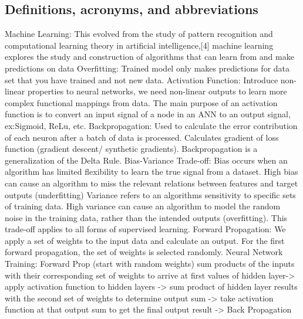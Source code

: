 \documentclass[draftclsnofoot, onecolumn, 10pt, compsoc]{IEEEtran}
\begin{document}
\subsection{Definitions, acronyms, and abbreviations}
Machine Learning: This evolved from the study of pattern recognition and computational learning theory in artificial intelligence,[4] machine learning explores the study and construction of algorithms that can learn from and make predictions on data
\newline \newline
Overfitting: Trained model only makes predictions for data set that you have trained and not new data.
\newline \newline
Activation Function: Introduce non-linear properties to neural networks, we need non-linear outputs to learn more complex functional mappings from data. The main purpose of an activation function is to convert an input signal of a  node in an ANN to an output signal, ex:Sigmoid, ReLu, etc.
\newline \newline
Backpropagation: Used to calculate the error contribution of each neuron after a batch of data is processed. Calculates gradient of loss function (gradient descent/ synthetic gradients). Backpropagation is a generalization of the Delta Rule.
\newline \newline
Bias-Variance Trade-off: Bias occurs when an algorithm has limited flexibility to learn the true signal from a dataset. High bias can cause an algorithm to miss the relevant relations between features and target outputs (underfitting) Variance refers to an algorithms sensitivity to specific sets of training data. High variance can cause an algorithm to model the random noise in the training data, rather  than the intended outputs (overfitting). This trade-off applies to all forms of supervised learning.
\newline \newline
Forward Propagation: We apply a set of weights to the input data and calculate an output. For the first forward propagation, the set of weights is selected randomly.
\newline \newline
Neural Network Training: Forward Prop (start with random weights) sum products of the inputs with their corresponding set of weights to arrive at first values of hidden layer-> apply activation function to hidden layers -> sum product of hidden layer results with the second set of weights to determine output sum -> take activation function at that output sum to get the final output result -> Back Propagation \cite{neuralnets} \newline
\end{document}
